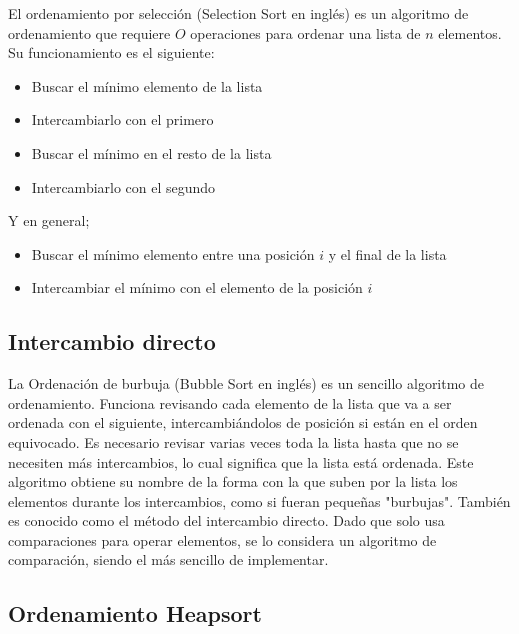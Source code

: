 \documentclass{article}
\begin{document}
El ordenamiento por selecci\'on (Selection Sort en ingl\'es) es un algoritmo de
ordenamiento que requiere $O$ operaciones para ordenar una lista de $n$ elementos.
Su funcionamiento es el siguiente:\\
\begin{itemize}
\item Buscar el m\'inimo elemento de la lista
\item Intercambiarlo con el primero
\item Buscar el m\'inimo en el resto de la lista
\item Intercambiarlo con el segundo
\end{itemize}
Y en general;\\
\begin{itemize}
\item Buscar el m\'inimo elemento entre una posici\'on $i$ y el final de la lista
\item Intercambiar el m\'inimo con el elemento de la posici\'on $i$
\end{itemize}

\subsection*{Intercambio directo}

La Ordenaci\'on de burbuja (Bubble Sort en ingl\'es) es un sencillo algoritmo de
ordenamiento. Funciona revisando cada elemento de la lista que va a ser ordenada con el
siguiente, intercambi\'andolos de posici\'on si est\'an en el orden equivocado. Es necesario
revisar varias veces toda la lista hasta que no se necesiten m\'as intercambios, lo cual
significa que la lista est\'a ordenada. Este algoritmo obtiene su nombre de la forma con
la que suben por la lista los elementos durante los intercambios, como si fueran
peque\~nas "burbujas". Tambi\'en es conocido como el m\'etodo del intercambio directo.
Dado que solo usa comparaciones para operar elementos, se lo considera un algoritmo de
comparaci\'on, siendo el m\'as sencillo de implementar.

\subsection*{Ordenamiento Heapsort}
\end{document}
